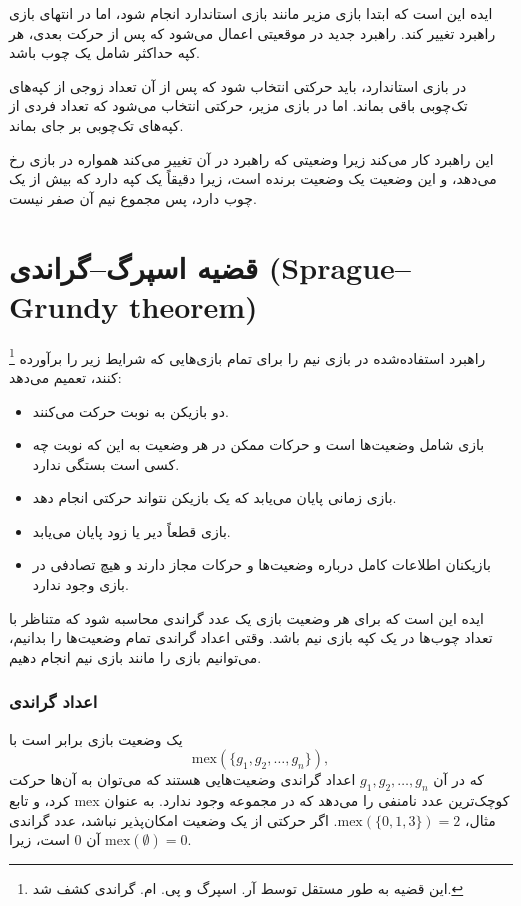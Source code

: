 ایده این است که ابتدا بازی مزیر مانند بازی استاندارد انجام شود، اما در انتهای بازی راهبرد تغییر کند. راهبرد جدید در موقعیتی اعمال می‌شود که پس از حرکت بعدی، هر کپه حداکثر شامل یک چوب باشد.

در بازی استاندارد، باید حرکتی انتخاب شود که پس از آن تعداد زوجی از کپه‌های تک‌چوبی باقی بماند. اما در بازی مزیر، حرکتی انتخاب می‌شود که تعداد فردی از کپه‌های تک‌چوبی بر جای بماند.

این راهبرد کار می‌کند زیرا وضعیتی که راهبرد در آن تغییر می‌کند همواره در بازی رخ می‌دهد، و این وضعیت یک وضعیت برنده است، زیرا دقیقاً یک کپه دارد که بیش از یک چوب دارد، پس مجموع نیم آن صفر نیست.

\section{قضیه اسپرگ–گراندی (Sprague–Grundy theorem)}


\footnote{این قضیه به طور مستقل توسط آر. اسپرگ \cite{spr35} و پی. ام. گراندی \cite{gru39} کشف شد.} راهبرد استفاده‌شده در بازی نیم را برای تمام بازی‌هایی که شرایط زیر را برآورده کنند، تعمیم می‌دهد:

\begin{itemize}[noitemsep]
\item دو بازیکن به نوبت حرکت می‌کنند.
\item بازی شامل وضعیت‌ها است و حرکات ممکن در هر وضعیت به این که نوبت چه کسی است بستگی ندارد.
\item بازی زمانی پایان می‌یابد که یک بازیکن نتواند حرکتی انجام دهد.
\item بازی قطعاً دیر یا زود پایان می‌یابد.
\item بازیکنان اطلاعات کامل درباره وضعیت‌ها و حرکات مجاز دارند و هیچ تصادفی در بازی وجود ندارد.
\end{itemize}
ایده این است که برای هر وضعیت بازی یک عدد گراندی محاسبه شود که متناظر با تعداد چوب‌ها در یک کپه بازی نیم باشد. وقتی اعداد گراندی تمام وضعیت‌ها را بدانیم، می‌توانیم بازی را مانند بازی نیم انجام دهیم.

\subsubsection{اعداد گراندی}


 یک وضعیت بازی برابر است با
\[\textrm{mex}(\{g_1,g_2,\ldots,g_n\}),\]
که در آن $g_1,g_2,\ldots,g_n$ اعداد گراندی
وضعیت‌هایی هستند که می‌توان به آن‌ها حرکت کرد،
و تابع mex کوچک‌ترین عدد نامنفی را می‌دهد
که در مجموعه وجود ندارد.
به عنوان مثال، $\textrm{mex}(\{0,1,3\})=2$.
اگر حرکتی از یک وضعیت امکان‌پذیر نباشد،
عدد گراندی آن 0 است، زیرا
$\textrm{mex}(\emptyset)=0$.

